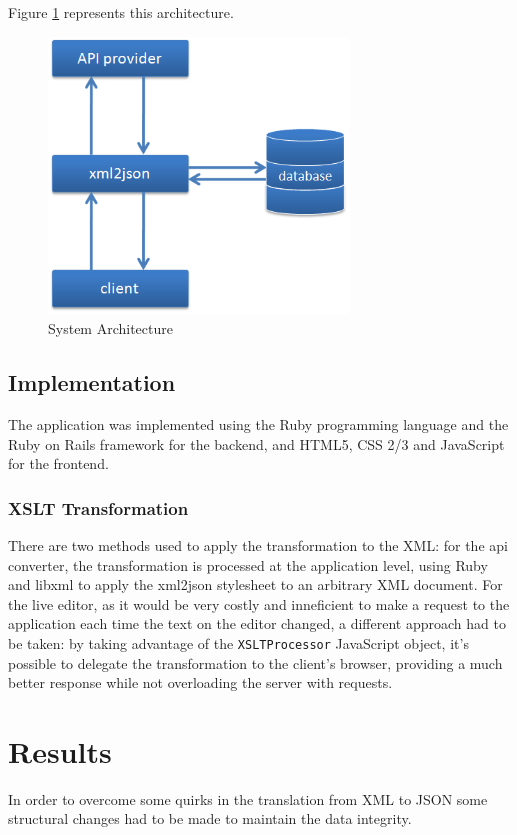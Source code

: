 \documentclass[twocolumn,twoside,10pt,a4paper]{article}
\begin{document}
Figure \ref{fig:system_arch} represents this architecture.

\begin{figure}[h]
    \centering
    \includegraphics[width=80mm]{images/arch.png}
    \caption{System Architecture}
    \label{fig:system_arch}
\end{figure}

\subsection{Implementation}\label{sec:implementation}

The application was implemented using the Ruby programming language and the Ruby on Rails framework for the backend, and HTML5, CSS 2/3 and JavaScript for the frontend.

\subsubsection{XSLT Transformation}\label{sec:xslt-transformation}

There are two methods used to apply the transformation to the XML: for the api converter, the transformation is processed at the application level, using Ruby and libxml to apply the xml2json stylesheet to an arbitrary XML document. For the live editor, as it would be very costly and inneficient to make a request to the application each time the text on the editor changed, a different approach had to be taken: by taking advantage of the \verb!XSLTProcessor! JavaScript object, it's possible to delegate the transformation to the client's browser, providing a much better response while not overloading the server with requests.

\section{Results}\label{sec:results}
In order to overcome some quirks in the translation from XML to JSON some structural changes had to be made to maintain the data integrity.
\end{document}
